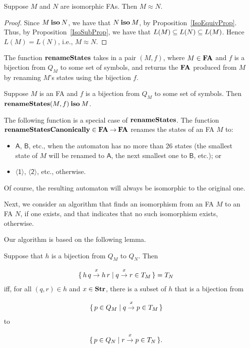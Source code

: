 \begin{proposition}
Suppose $M$ and $N$ are isomorphic FAs. Then $M\approx N$.
\end{proposition}

\begin{proof}
Since $M\mathbin{\mathbf{iso}} N$, we have that $N\mathbin{\mathbf{iso}} M$, by Proposition~\ref{IsoEquivProp}.
Thus, by Proposition~\ref{IsoSubProp}, we have that $L(M)\subseteq L(N)\subseteq L(M)$.
Hence $L(M)=L(N)$, i.e., $M\approx N$.
\end{proof}

The function $\mathbf{renameStates}$ takes in a pair $(M,f)$, where $M\in\mathbf{FA}$
%
%
%
and $f$ is a bijection from $Q_M$ to some set of symbols, and returns
the $\mathbf{FA}$ produced from $M$ by renaming $M$'s states using the
bijection $f$.

\begin{proposition}
Suppose $M$ is an FA and $f$ is a bijection from $Q_M$ to some set of
symbols.  Then $\mathbf{renameStates}(M,f)\mathbin{\mathbf{iso}} M$.
\end{proposition}

The following function is a special case of $\mathbf{renameStates}$.
The function $\mathbf{renameStatesCanonically}\in\mathbf{FA}\mathbin{\to}\mathbf{FA}$ renames the
%
%
states of an FA $M$ to:
\begin{itemize}
\item $\mathsf{A}$, $\mathsf{B}$, etc., when the automaton has no more
than 26 states (the smallest state of $M$ will be renamed to
$\mathsf{A}$, the next smallest one to $\mathsf{B}$, etc.); or

\item $\mathsf{\langle 1\rangle}$, $\mathsf{\langle 2\rangle}$, etc.,
otherwise.
\end{itemize}
Of course, the resulting automaton will always be isomorphic to the original
one.

Next, we consider an algorithm that finds an isomorphism from an FA
%
%
$M$ to an FA $N$, if one exists, and that indicates that no such
isomorphism exists, otherwise.

Our algorithm is based on the following lemma.
\begin{lemma}
\label{IsoLem}
Suppose that $h$ is a bijection from $Q_M$ to $Q_N$.  Then
\begin{gather*}
\{ \, h\,q \stackrel{\strut x}{\rightarrow} h\,r \mid q \stackrel{\strut x}{\rightarrow} r\in T_M \, \} = T_N
\end{gather*}
iff, for all $(q, r)\in h$ and
$x\in\mathbf{Str}$, there is a subset of $h$ that is a bijection from
\begin{gather*}
\{ \, p\in Q_M \mid q \stackrel{\strut x}{\rightarrow} p\in T_M \, \}
\end{gather*}
to
\begin{gather*}
\{ \, p\in Q_N \mid r \stackrel{\strut x}{\rightarrow} p\in T_N \, \} .
\end{gather*}
\end{lemma}

